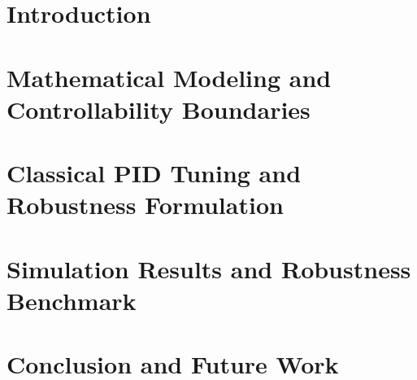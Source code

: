 \documentclass[journal]{IEEEtran}
\begin{document}
\section{Introduction}
\label{sec:intro}


\section{Mathematical Modeling and Controllability Boundaries}
\label{sec:model}


\section{Classical PID Tuning and Robustness Formulation}
\label{sec:pid}


\section{Simulation Results and Robustness Benchmark}
\label{sec:results}


\section{Conclusion and Future Work}
\label{sec:conclusion}


\balance
\let\oldthebibliography\thebibliography
\let\endoldthebibliography\endthebibliography
\renewenvironment{thebibliography}[1]{%
  \begin{oldthebibliography}{#1}%
    \footnotesize
    \setlength{\itemsep}{0.2pt plus 0.3pt minus 0.1pt}%
    \setlength{\parskip}{0pt}%
}{%
  \end{oldthebibliography}%
}



\end{document}

